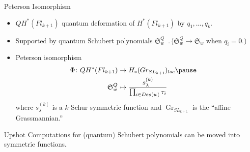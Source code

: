 \documentclass{beamer}
\DeclareMathOperator{\Gr}{Gr}
\newcommand{\sym}{\Lambda}
\renewcommand{\S}{\mathfrak{S}}
\begin{document}
\begin{frame}{Peterson Isomorphism}
  \begin{itemize}
  \item \(QH^*(Fl_{k+1})\) quantum deformation of
    \(H^*(Fl_{k+1})\) by \(q_1,\ldots,q_k\).\pause
  \item Supported by quantum Schubert polynomials
    \(\S_w^Q\)~\cite{FGP}.\pause\,(\(\S_w^Q \to \S_w\) when \(q_i =
    0\).) \pause
  \item Peterson isomorphism
    \begin{eqnarray*}
      \Phi\colon QH^*(Fl_{k+1}) & \to H_*(Gr_{SL_{k+1}})_{loc} \pause \\
      \S_w^Q & \mapsto \frac{\displaystyle s_\lambda^{(k)}
               }{\prod_{i \in Des(w)} \tau_i} 
    \end{eqnarray*}
    where \(s_\lambda^{(k)}\) is a \(k\)-Schur symmetric function and
    \(\Gr_{SL_{k+1}}\) is the ``affine Grassmannian.'' 
  \end{itemize}
  \begin{block}{Upshot}
    \pause
    Computations for (quantum) Schubert polynomials can be moved into symmetric functions.
  \end{block}
\end{frame}
\end{document}
